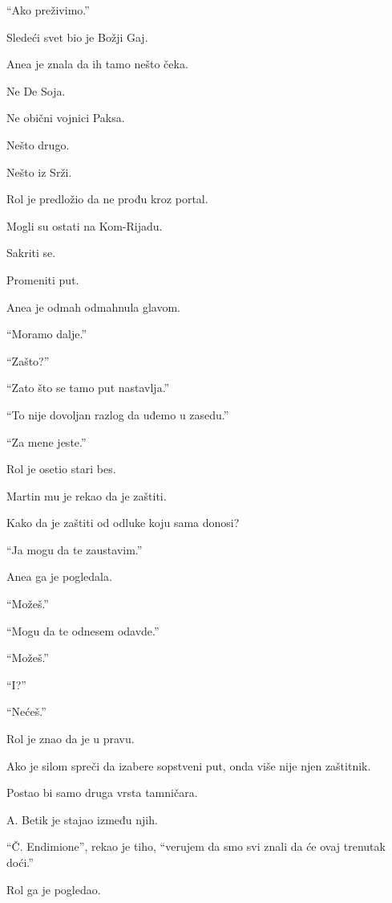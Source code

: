 ``Ako preživimo.''

\bigskip

Sledeći svet bio je Božji Gaj.

Anea je znala da ih tamo nešto čeka.

Ne De Soja.

Ne obični vojnici Paksa.

Nešto drugo.

Nešto iz Srži.

\bigskip

Rol je predložio da ne prođu kroz portal.

Mogli su ostati na Kom-Rijadu.

Sakriti se.

Promeniti put.

\bigskip

Anea je odmah odmahnula glavom.

``Moramo dalje.''

``Zašto?''

``Zato što se tamo put nastavlja.''

``To nije dovoljan razlog da uđemo u zasedu.''

``Za mene jeste.''

\bigskip

Rol je osetio stari bes.

Martin mu je rekao da je zaštiti.

Kako da je zaštiti od odluke koju sama donosi?

\bigskip

``Ja mogu da te zaustavim.''

Anea ga je pogledala.

``Možeš.''

``Mogu da te odnesem odavde.''

``Možeš.''

``I?''

``Nećeš.''

\bigskip

Rol je znao da je u pravu.

Ako je silom spreči da izabere sopstveni put, onda više nije njen zaštitnik.

Postao bi samo druga vrsta tamničara.

\bigskip

A. Betik je stajao između njih.

``Č. Endimione'', rekao je tiho, ``verujem da smo svi znali da će ovaj trenutak doći.''

Rol ga je pogledao.

